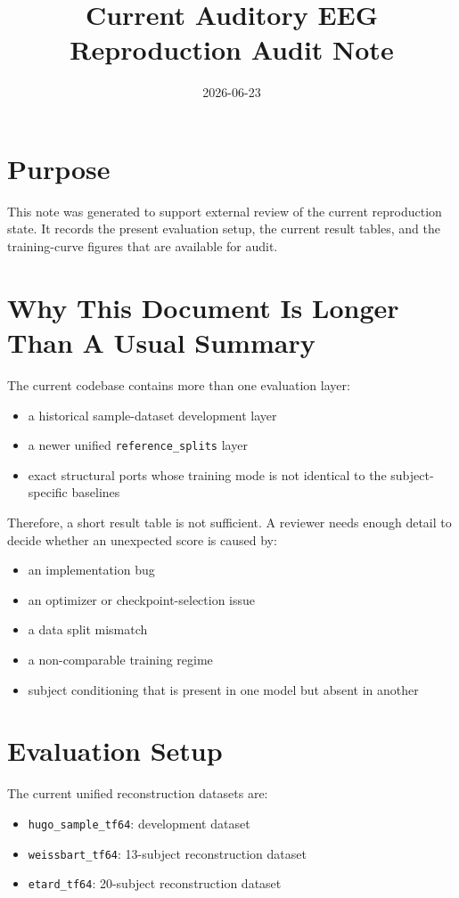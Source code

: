 \documentclass[11pt]{article}
\title{Current Auditory EEG Reproduction Audit Note}
\date{2026-06-23}
\begin{document}
\maketitle

\section*{Purpose}
This note was generated to support external review of the current reproduction state. It records the present evaluation setup, the current result tables, and the training-curve figures that are available for audit.

\section*{Why This Document Is Longer Than A Usual Summary}
The current codebase contains more than one evaluation layer:
\begin{itemize}
\item a historical sample-dataset development layer
\item a newer unified \texttt{reference\_splits} layer
\item exact structural ports whose training mode is not identical to the subject-specific baselines
\end{itemize}
Therefore, a short result table is not sufficient. A reviewer needs enough detail to decide whether an unexpected score is caused by:
\begin{itemize}
\item an implementation bug
\item an optimizer or checkpoint-selection issue
\item a data split mismatch
\item a non-comparable training regime
\item subject conditioning that is present in one model but absent in another
\end{itemize}

\section*{Evaluation Setup}
The current unified reconstruction datasets are:
\begin{itemize}
\item \texttt{hugo\_sample\_tf64}: development dataset
\item \texttt{weissbart\_tf64}: 13-subject reconstruction dataset
\item \texttt{etard\_tf64}: 20-subject reconstruction dataset
\end{itemize}
\end{document}
